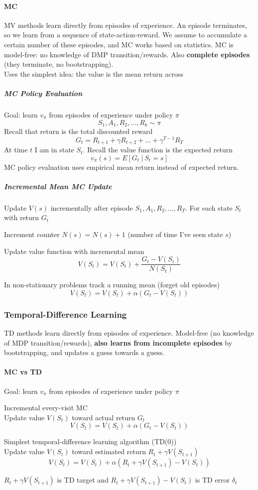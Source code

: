 \documentclass[10pt]{report}
\begin{document}
\paragraph{MC} MV methods learn directly from episodes of experience. An episode terminates, so we learn from a sequence of state-action-reward. We assume to accumulate a certain number of these episodes, and MC works based on statistics. MC is model-free: no knowledge of DMP transition/rewards. Also \textbf{complete episodes} (they terminate, no bootstrapping).\\
Uses the simplest idea: the value is the mean return across %
\subparagraph{MC Policy Evaluation} Goal: learn $v_\pi$ from episodes of experience under policy $\pi$
$$S_1,A_1,R_2,\ldots,R_k\sim \pi$$
Recall that return is the total discounted reward
$$G_t = R_{t+1} + \gamma R_{t+2} + \ldots + \gamma^{T-1}R_T$$
At time $t$ I am in state $S_t$. Recall the value function is the expected return $$v_\pi(s)=E[G_t\:|\:S_t=s]$$
MC policy evaluation uses empirical mean return instead of expected return.
\subparagraph{Incremental Mean MC Update} Update $V(s)$ incrementally after episode $S_1,A_1,R_2,\ldots, R_T$. For each state $S_t$ with return $G_t$\begin{list}{}{}
	\item Increment counter $N(s) = N(s) + 1$ (number of time I've seen state $s$)
	\item Update value function with incremental mean
	$$V(S_t) = V(S_t) + \frac{G_t - V(S_t)}{N(S_t)}$$
\end{list}
In non-stationary problems track a running mean (forget old episodes)
$$V(S_t) = V(S_t) +\alpha(G_t-V(S_t))$$
\subsubsection{Temporal-Difference Learning}
TD methods learn directly from episodes of experience. Model-free (no knowledge of MDP transition/rewards), \textbf{also learns from incomplete episodes} by bootstrapping, and updates a guess towards a guess.
\paragraph{MC vs TD} Goal: learn $v_\pi$ from episodes of experience under policy $\pi$
\begin{list}{}{}
	\item Incremental every-visit MC\\
	Update value $V(S_t)$ toward actual return $G_t$
	$$V(S_t) = V(S_t) +\alpha(G_t-V(S_t))$$
	\item Simplest temporal-difference learning algorithm (TD(0))\\
	Update value $V(S_t)$ toward estimated return $R_t + \gamma V(S_{t+1})$
	$$V(S_t) = V(S_t) + \alpha(R_t+\gamma V(S_{t+1}) - V(S_t))$$
\end{list}
$R_t+\gamma V(S_{t+1})$ is TD target and  $R_t+\gamma V(S_{t+1}) - V(S_t)$ is TD error $\delta_t$
\end{document}
